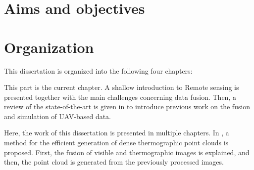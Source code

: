 \section{Aims and objectives}

\section{Organization}

This dissertation is organized into the following four chapters:

\small {} \normalsize\hspace{3mm} This part is the current chapter. A shallow introduction to \gls{Remote sensing} is presented together with the main challenges concerning data fusion. Then, a review of the state-of-the-art is given in  to introduce previous work on the fusion and simulation of UAV-based data.

\small {} \normalsize\hspace{3mm} Here, the work of this dissertation is presented in multiple chapters. In , a method for the efficient generation of dense thermographic point clouds is proposed. First, the fusion of visible and thermographic images is explained, and then, the point cloud is generated from the previously processed images.   